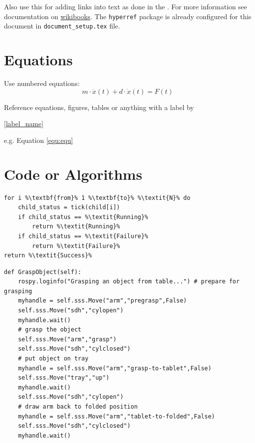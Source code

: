 Also use this for adding links into text as done in the \footnotemark[1]. For more information see documentation on \href{https://de.wikibooks.org/wiki/LaTeX-W%C3%B6rterbuch:_hyperref}{wikibooks}. The \texttt{hyperref} package is already configured for this document in \texttt{document\_setup.tex} file.


\section{Equations}
Use numbered equations:
\begin{equation} \label{equ:equ}
  m \cdot \ddot{x}(t) + d \cdot \dot{x}(t) = F(t)
\end{equation}

Reference equations, figures, tables or anything with a label by 

\begin{spverbatim}
\ref{label_name}
\end{spverbatim}
e.g. Equation \ref{equ:equ}

\section{Code or Algorithms}

\begin{lstlisting}
for i %\textbf{from}% 1 %\textbf{to}% %\textit{N}% do
    child_status = tick(child[i])
    if child_status == %\textit{Running}%
        return %\textit{Running}%
    if child_status == %\textit{Failure}%
        return %\textit{Failure}%
return %\textit{Success}%
\end{lstlisting}

\begin{lstlisting}
def GraspObject(self):
    rospy.loginfo("Grasping an object from table...") # prepare for grasping
    myhandle = self.sss.Move("arm","pregrasp",False)
    self.sss.Move("sdh","cylopen")
    myhandle.wait()
    # grasp the object
    self.sss.Move("arm","grasp")
    self.sss.Move("sdh","cylclosed")
    # put object on tray
    myhandle = self.sss.Move("arm","grasp-to-tablet",False)
    self.sss.Move("tray","up")
    myhandle.wait()
    self.sss.Move("sdh","cylopen")
    # draw arm back to folded position
    myhandle = self.sss.Move("arm","tablet-to-folded",False)
    self.sss.Move("sdh","cylclosed")
    myhandle.wait()
\end{lstlisting}

